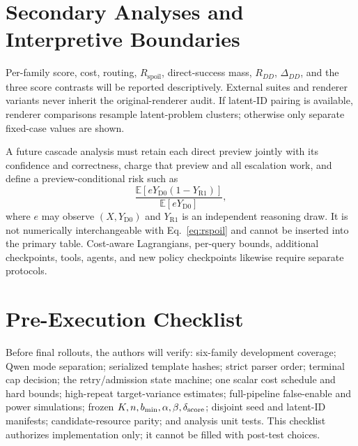 \documentclass{article}
\newcommand{\D}{\ensuremath{\mathrm{D}}}
\newcommand{\Rpol}{\ensuremath{\mathrm{R}}}
\newcommand{\1}{\mathbb{I}}
\newcommand{\E}{\mathbb{E}}
\newcommand{\Rspoil}{R_{\mathrm{spoil}}}
\begin{document}
\section{Secondary Analyses and Interpretive Boundaries}
Per-family score, cost, routing, $\Rspoil$, direct-success mass, $R_{DD}$, $\Delta_{DD}$, and the three score contrasts will be reported descriptively. External suites and renderer variants never inherit the original-renderer audit. If latent-ID pairing is available, renderer comparisons resample latent-problem clusters; otherwise only separate fixed-case values are shown.

A future cascade analysis must retain each direct preview jointly with its confidence and correctness, charge that preview and all escalation work, and define a preview-conditional risk such as
\[
 \frac{\E[eY_{\D0}(1-Y_{\Rpol1})]}{\E[eY_{\D0}]},
\]
where $e$ may observe $(X,Y_{\D0})$ and $Y_{\Rpol1}$ is an independent reasoning draw. It is not numerically interchangeable with Eq.~\ref{eq:rspoil} and cannot be inserted into the primary table. Cost-aware Lagrangians, per-query bounds, additional checkpoints, tools, agents, and new policy checkpoints likewise require separate protocols.

\section{Pre-Execution Checklist}
Before final rollouts, the authors will verify: six-family development coverage; Qwen mode separation; serialized template hashes; strict parser order; terminal cap decision; the retry/admission state machine; one scalar cost schedule and hard bounds; high-repeat target-variance estimates; full-pipeline false-enable and power simulations; frozen $K,n,b_{\min},\alpha,\beta,\delta_{\rm score}$; disjoint seed and latent-ID manifests; candidate-resource parity; and analysis unit tests. This checklist authorizes implementation only; it cannot be filled with post-test choices.
\end{document}
